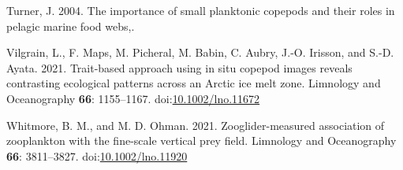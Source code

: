 \documentclass[
  letterpaper,
  DIV=11,
  numbers=noendperiod]{scrartcl}
\newlength{\cslhangindent}
\newlength{\cslentryspacingunit} %
\newenvironment{CSLReferences}[2] %
 {%
  \setlength{\parindent}{0pt}
  \ifodd #1
  \let\oldpar\par
  \def\par{\hangindent=\cslhangindent\oldpar}
  \fi
  \setlength{\parskip}{#2\cslentryspacingunit}
 }%
 {}
\begin{document}
\begin{CSLReferences}{1}{0}
\leavevmode{}%
Turner, J. 2004. The importance of small planktonic copepods and their
roles in pelagic marine food webs,.

\leavevmode{}%
Vilgrain, L., F. Maps, M. Picheral, M. Babin, C. Aubry, J.-O. Irisson,
and S.-D. Ayata. 2021. Trait-based approach using in situ copepod images
reveals contrasting ecological patterns across an Arctic ice melt zone.
Limnology and Oceanography \textbf{66}: 1155--1167.
doi:\href{https://doi.org/10.1002/lno.11672}{10.1002/lno.11672}

\leavevmode{}%
Whitmore, B. M., and M. D. Ohman. 2021. Zooglider-measured association
of zooplankton with the fine-scale vertical prey field. Limnology and
Oceanography \textbf{66}: 3811--3827.
doi:\href{https://doi.org/10.1002/lno.11920}{10.1002/lno.11920}

\end{CSLReferences}
\end{document}
